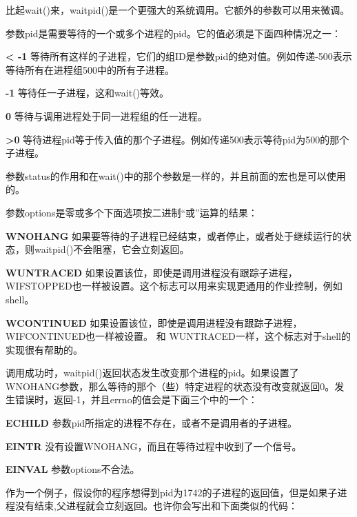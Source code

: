 比起wait()来，waitpid()是一个更强大的系统调用。它额外的参数可以用来微调。

参数pid是需要等待的一个或多个进程的pid。它的值必须是下面四种情况之一：

\begin{eqlist*}
\item[\textbf{< -1}] 等待所有这样的子进程，它们的组ID是参数pid的绝对值。例如传递-500表示等待所有在进程组500中的所有子进程。
\item[\textbf{-1}] 等待任一子进程，这和wait()等效。
\item[\textbf{0}] 等待与调用进程处于同一进程组的任一进程。
\item[\textbf{>0}] 等待进程pid等于传入值的那个子进程。例如传递500表示等待pid为500的那个子进程。
\end{eqlist*}

参数status的作用和在wait()中的那个参数是一样的，并且前面的宏也是可以使用的。

参数options是零或多个下面选项按二进制“或”运算的结果：

\begin{eqlist*}
\item[\textbf{WNOHANG}]	如果要等待的子进程已经结束，或者停止，或者处于继续运行的状态，则waitpid()不会阻塞，它会立刻返回。
\item[\textbf{WUNTRACED}] 如果设置该位，即使是调用进程没有跟踪子进程，WIFSTOPPED也一样被设置。这个标志可以用来实现更通用的作业控制，例如shell。
\item[\textbf{WCONTINUED}] 如果设置该位，即使是调用进程没有跟踪子进程，WIFCONTINUED也一样被设置。 和 WUNTRACED一样，这个标志对于shell的实现很有帮助的。
\end{eqlist*}

调用成功时，waitpid()返回状态发生改变那个进程的pid。如果设置了WNOHANG参数，那么等待的那个（些）特定进程的状态没有改变就返回0。发生错误时，返回-1，并且errno的值会是下面三个中的一个：

\begin{eqlist*}
\item[\textbf{ECHILD}] 参数pid所指定的进程不存在，或者不是调用者的子进程。
\item[\textbf{EINTR}] 没有设置WNOHANG，而且在等待过程中收到了一个信号。
\item[\textbf{EINVAL}] 参数options不合法。
\end{eqlist*}

作为一个例子，假设你的程序想得到pid为1742的子进程的返回值，但是如果子进程没有结束,父进程就会立刻返回。也许你会写出和下面类似的代码：

